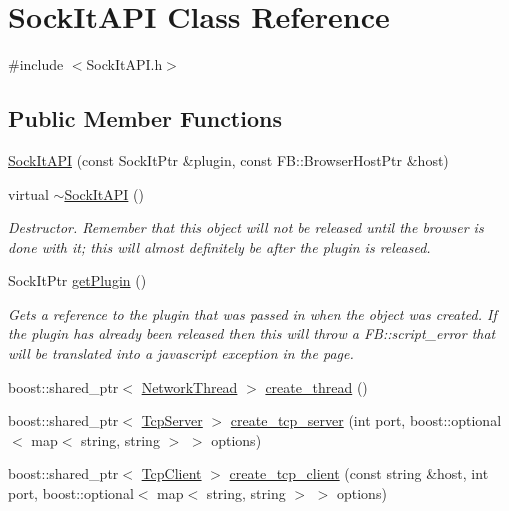 \hypertarget{classSockItAPI}{
\section{SockItAPI Class Reference}
\label{classSockItAPI}
}


{\ttfamily \#include $<$SockItAPI.h$>$}

\subsection*{Public Member Functions}
\begin{DoxyCompactItemize}
\item 
\hyperlink{classSockItAPI_abe90f8a1c172737a1c52d7216b0adee1}{SockItAPI} (const SockItPtr \&plugin, const FB::BrowserHostPtr \&host)
\item 
virtual \hyperlink{classSockItAPI_ab1bdcadeb41aea91e9adb5ae934bf742}{$\sim$SockItAPI} ()
\begin{DoxyCompactList}\small\item\em Destructor. Remember that this object will not be released until the browser is done with it; this will almost definitely be after the plugin is released. \item\end{DoxyCompactList}\item 
SockItPtr \hyperlink{classSockItAPI_a196d7874f3124a28bca5dd3f9acb5c60}{getPlugin} ()
\begin{DoxyCompactList}\small\item\em Gets a reference to the plugin that was passed in when the object was created. If the plugin has already been released then this will throw a FB::script\_\-error that will be translated into a javascript exception in the page. \item\end{DoxyCompactList}\item 
boost::shared\_\-ptr$<$ \hyperlink{classNetworkThread}{NetworkThread} $>$ \hyperlink{classSockItAPI_a5de4cedcdcfff3bc3fd88aa52f62b2eb}{create\_\-thread} ()
\item 
boost::shared\_\-ptr$<$ \hyperlink{classTcpServer}{TcpServer} $>$ \hyperlink{classSockItAPI_a48b4b81ac34fb4135c2067eb5477144a}{create\_\-tcp\_\-server} (int port, boost::optional$<$ map$<$ string, string $>$ $>$ options)
\item 
boost::shared\_\-ptr$<$ \hyperlink{classTcpClient}{TcpClient} $>$ \hyperlink{classSockItAPI_a926d3fe9cdbcf52f4a40a922a4d3a0b7}{create\_\-tcp\_\-client} (const string \&host, int port, boost::optional$<$ map$<$ string, string $>$ $>$ options)

\end{DoxyCompactItemize}
